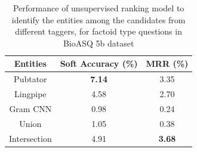 



\begin{table}[t!]
    \centering
    \begin{tabular}{ccc} \hline
    Entities & Soft Accuracy (\%) & MRR (\%) \\ \hline
    Pubtator & \textbf{7.14} & 3.35 \\
    Lingpipe & 4.58 & 2.70 \\
    Gram CNN & 0.98 & 0.24 \\
    Union    & 1.05 & 0.38 \\
    Intersection & 4.91 & \textbf{3.68} \\ \hline
    \end{tabular}
    \caption{Performance of unsupervised ranking model to identify the entities among the candidates from different taggers, for factoid type questions in BioASQ 5b dataset}
    \label{tab:unsup_performance}
\end{table}

